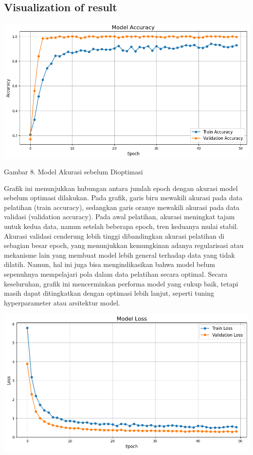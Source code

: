 \documentclass[12pt,a4paper]{article}
\begin{document}
\subsection{Visualization of result}
\begin{center}
    \includegraphics[width=1.0\textwidth]{images/8.png}
\end{center}

\begin{center}
    Gambar 8. Model Akurasi sebelum Dioptimasi
\end{center}

Grafik ini menunjukkan hubungan antara jumlah epoch dengan akurasi model sebelum optimasi dilakukan. Pada grafik, garis biru mewakili akurasi pada data pelatihan (train accuracy), sedangkan garis oranye mewakili akurasi pada data validasi (validation accuracy). Pada awal pelatihan, akurasi meningkat tajam untuk kedua data, namun setelah beberapa epoch, tren keduanya mulai stabil. Akurasi validasi cenderung lebih tinggi dibandingkan akurasi pelatihan di sebagian besar epoch, yang menunjukkan kemungkinan adanya regularisasi atau mekanisme lain yang membuat model lebih general terhadap data yang tidak dilatih. Namun, hal ini juga bisa mengindikasikan bahwa model belum sepenuhnya mempelajari pola dalam data pelatihan secara optimal. Secara keseluruhan, grafik ini mencerminkan performa model yang cukup baik, tetapi masih dapat ditingkatkan dengan optimasi lebih lanjut, seperti tuning hyperparameter atau arsitektur model.

\begin{center}
    \includegraphics[width=1\textwidth]{images/9.png}
\end{center}
\end{document}
